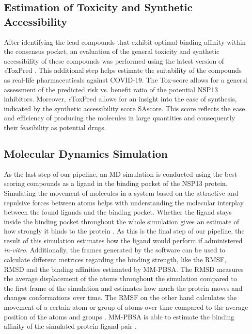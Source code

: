 \documentclass[11pt, letterpaper, titlepage]{article}
\renewcommand{\cite}{\parencite}
\begin{document}
\subsection{Estimation of Toxicity and Synthetic Accessibility}
 After identifying the lead compounds that exhibit optimal binding affinity within the consensus pocket, an evaluation of the general toxicity and synthetic accessibility of these compounds was performed using the latest version of \textit{e}ToxPred \cite{pu2019toxpred}. This additional step helps estimate the suitability of the compounds as real-life pharmaceuticals against COVID-19. The Tox-score allows for a general assessment of the predicted risk vs. benefit ratio of the potential NSP13 inhibitors. Moreover, \textit{e}ToxPred allows for an insight into the ease of synthesis, indicated by the synthetic accessibility score \ac{SAscore}. This score reflects the ease and efficiency of producing the molecules in large quantities and consequently their feasibility as potential drugs. 

\subsection{Molecular Dynamics Simulation}
As the last step of our pipeline, an \ac{MD} simulation is conducted using the best-scoring compounds as a ligand in the binding pocket of the \ac{NSP13} protein. Simulating the movement of molecules in a system based on the attractive and repulsive forces between atoms helps with understanding the molecular interplay between the found ligands and the binding pocket. Whether the ligand stays inside  the binding pocket throughout the whole simulation gives an estimate of how strongly it binds to the protein \cite{MD_Basics}. As this is the final step of our pipeline, the result of this simulation estimates how the ligand would perform if administered \textit{in-vitro}. Additionally, the frames generated by the software can be used to calculate different metrices regarding the binding strength, like the \ac{RMSF}, \ac{RMSD} and the binding affinities estimated by \ac{MM-PBSA}. The \ac{RMSD} measures the average displacement of the atoms throughout the simulation compared to the first frame of the simulation and estimates how much the protein moves and changes conformations over time. The \ac{RMSF} on the other hand calculates the movement of a certain atom or group of atoms over time compared to the average position of the atoms and groups \cite{RMSD_RMSF}. \ac{MM-PBSA} is able to estimate the binding affinity of the simulated protein-ligand pair \cite{MM_PBSA}.
\end{document}
